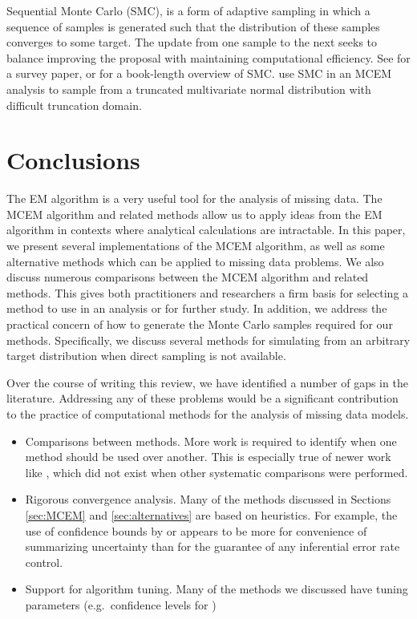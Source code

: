 \documentclass[11pt, oneside]{article}   	%
\begin{document}
Sequential Monte Carlo (SMC), is a form of adaptive sampling in which a sequence of samples is generated such that the distribution of these samples converges to some target. The update from one sample to the next seeks to balance improving the proposal with maintaining computational efficiency. See \citet{Del06} for a survey paper, or \citet{Cho20} for a book-length overview of SMC. \citet{Mof14} use SMC in an MCEM analysis to sample from a truncated multivariate normal distribution with difficult truncation domain.


\section{Conclusions}
\label{sec:conc}

The EM algorithm is a very useful tool for the analysis of missing data. The MCEM algorithm and related methods allow us to apply ideas from the EM algorithm in contexts where analytical calculations are intractable. In this paper, we present several implementations of the MCEM algorithm, as well as some alternative methods which can be applied to missing data problems. We also discuss numerous comparisons between the MCEM algorithm and related methods. This gives both practitioners and researchers a firm basis for selecting a method to use in an analysis or for further study. In addition, we address the practical concern of how to generate the Monte Carlo samples required for our methods. Specifically, we discuss several methods for simulating from an arbitrary target distribution when direct sampling is not available. 

Over the course of writing this review, we have identified a number of gaps in the literature. Addressing any of these problems would be a significant contribution to the practice of computational methods for the analysis of missing data models.

\begin{itemize}
    \item Comparisons between methods. More work is required to identify when one method should be used over another. This is especially true of newer work like \citet{Caf05}, which did not exist when other systematic comparisons were performed.
    \item Rigorous convergence analysis. Many of the methods discussed in Sections \ref{sec:MCEM} and \ref{sec:alternatives} are based on heuristics. For example, the use of confidence bounds by \citet{Boo99} or \citet{Caf05} appears to be more for convenience of summarizing uncertainty than for the guarantee of any inferential error rate control.
    \item Support for algorithm tuning. Many of the methods we discussed have tuning parameters (e.g.\ confidence levels for \citealp{Caf05})
\end{itemize}
\end{document}
